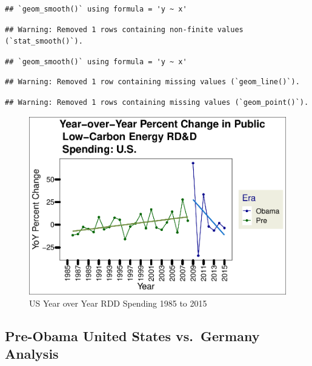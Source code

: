 \documentclass[
  12pt,
]{article}
\begin{document}
\begin{verbatim}
## `geom_smooth()` using formula = 'y ~ x'
\end{verbatim}

\begin{verbatim}
## Warning: Removed 1 rows containing non-finite values (`stat_smooth()`).
\end{verbatim}

\begin{verbatim}
## `geom_smooth()` using formula = 'y ~ x'
\end{verbatim}

\begin{verbatim}
## Warning: Removed 1 row containing missing values (`geom_line()`).
\end{verbatim}

\begin{verbatim}
## Warning: Removed 1 rows containing missing values (`geom_point()`).
\end{verbatim}

\begin{figure}
\centering
\includegraphics{Chang_Jenkins_Mullens_ENV872_Final_files/figure-latex/visualizing the US data-1.pdf}
\caption{US Year over Year RDD Spending 1985 to 2015}
\end{figure}

\hypertarget{pre-obama-united-states-vs.-germany-analysis}{%
\subsection{Pre-Obama United States vs.~Germany
Analysis}\label{pre-obama-united-states-vs.-germany-analysis}}
\end{document}
